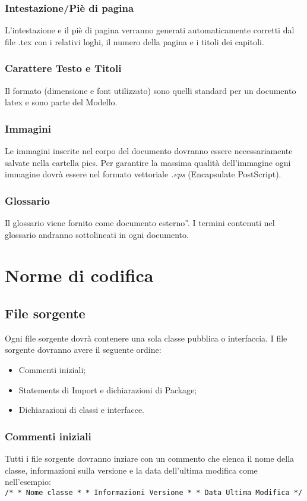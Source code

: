 \subsection{Intestazione/Pi\`e di pagina}
L'intestazione e il pi\`e di pagina verranno generati automaticamente corretti dal file .tex con i relativi loghi, il numero della pagina e i titoli dei capitoli.
\subsection{Carattere Testo e Titoli}
Il formato (dimensione e font utilizzato) sono quelli standard per un documento latex e sono parte del Modello.
\subsection{Immagini}
Le immagini inserite nel corpo del documento dovranno essere necessariamente salvate nella cartella pics. Per garantire la massima qualit\`a dell'immagine ogni immagine dovr\`a essere nel formato vettoriale \textit{.eps} (Encapsulate PostScript).
\subsection{Glossario}
Il glossario viene fornito come documento esterno \textit{\G}. I termini contenuti nel glossario andranno sottolineati in ogni documento.

\chapter{Norme di codifica}
\section{File sorgente}
Ogni file sorgente dovr\`a contenere una sola classe pubblica o interfaccia. I file sorgente dovranno avere il seguente ordine:
\begin{itemize}
\item Commenti iniziali;
\item Statements di Import e dichiarazioni di Package;
\item Dichiarazioni di classi e interfacce.
\end{itemize}
\subsection{Commenti iniziali}
Tutti i file sorgente dovranno inziare con un commento che elenca il nome della classe, informazioni sulla versione e la data dell'ultima modifica come nell'esempio: \\
 \newline
\texttt{/* \newline
* Nome classe \newline
* \newline
* Informazioni Versione \newline
* \newline
* Data Ultima Modifica \newline
*/ \\}
 \newline
